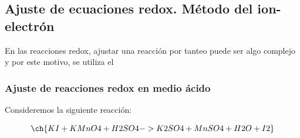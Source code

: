     \subsection{Ajuste de ecuaciones redox. Método del ion-electrón}\label{subsec:ajuste-de-ecuaciones-redox.-metodo-del-ion-electron}

    En las reacciones redox, ajustar una reacción por tanteo puede ser algo complejo y por este motivo, se utiliza el 

    \subsubsection{Ajuste de reacciones redox en medio ácido}

    Consideremos la siguiente reacción:

    \begin{equation*}
        \ch{KI + KMnO4 + H2SO4 -> K2SO4 + MnSO4 + H2O + I2}
    \end{equation*}


